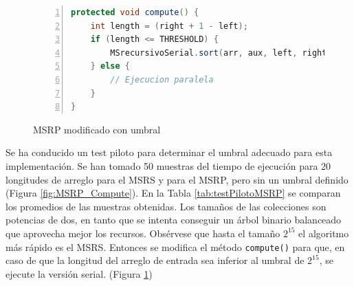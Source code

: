 \documentclass[titlepage]{article}
\begin{document}
\begin{figure}[h]
	\begin{lstlisting}[language=java, frame=single, numbers=left]
protected void compute() {
	int length = (right + 1 - left);
	if (length <= THRESHOLD) {
		MSrecursivoSerial.sort(arr, aux, left, right);
	} else {
		// Ejecucion paralela
	}
}
	\end{lstlisting}
	\caption{MSRP modificado con umbral}
	\label{fig:computeModificado}
\end{figure}

Se ha conducido un test piloto para determinar el umbral adecuado para esta implementación. Se han tomado 50 muestras del tiempo de ejecución para 20 longitudes de arreglo para el MSRS y para el MSRP, pero sin un umbral definido (Figura \ref{fig:MSRP_Compute}). En la Tabla \ref{tab:testPilotoMSRP} se comparan los promedios de las muestras obtenidas. Los tamaños de las colecciones son potencias de dos, en tanto que se intenta conseguir un árbol binario balanceado que aprovecha mejor los recursos. Obsérvese que hasta el tamaño $2^{15}$ el algoritmo más rápido es el MSRS. Entonces se modifica el método \lstinline|compute()| para que, en caso de que la longitud del arreglo de entrada sea inferior al umbral de $2^{15}$, se ejecute la versión serial. (Figura \ref{fig:computeModificado})
\end{document}
